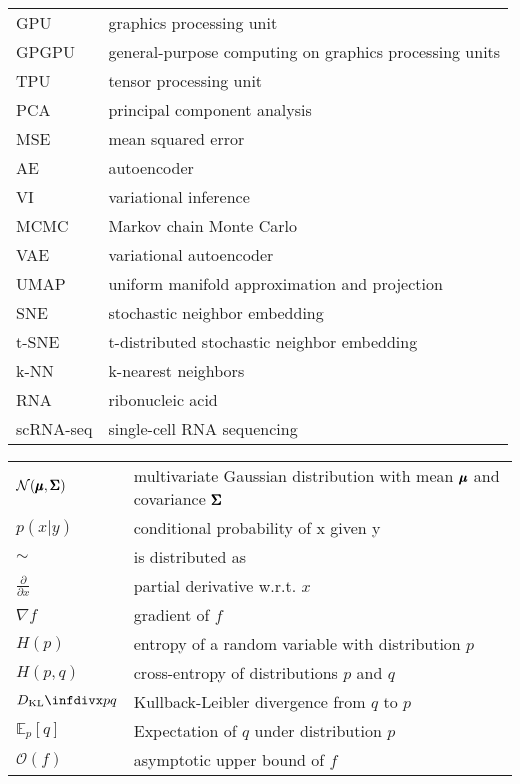 \begin{tabular}[h]{@{} p{} p{} @{}}
GPU & graphics processing unit \\
GPGPU & general-purpose computing on graphics processing units \\
TPU & tensor processing unit \\
PCA & principal component analysis \\
MSE & mean squared error \\
AE & autoencoder \\
VI & variational inference \\
MCMC & Markov chain Monte Carlo \\
VAE & variational autoencoder \\
UMAP & uniform manifold approximation and projection \\
SNE & stochastic neighbor embedding \\
t-SNE & t-distributed stochastic neighbor embedding \\
k-NN & k-nearest neighbors \\
RNA & ribonucleic acid \\
scRNA-seq & single-cell RNA sequencing
\end{tabular}

\begin{tabular}[h]{@{} p{} p{} @{}}
$\mathcal{N}(\pmb{\mu}, \pmb{\Sigma})$ & multivariate Gaussian distribution with mean $\pmb{\mu}$ and covariance $\pmb{\Sigma}$ \\
$p(x \vert y)$ & conditional probability of x given y \\
$\sim$ & is distributed as \\
$\frac{\partial}{\partial x}$ & partial derivative w.r.t. $x$ \\
$\nabla f$ & gradient of $f$ \\
$H(p)$ & entropy of a random variable with distribution $p$ \\
$H(p,q)$ & cross-entropy of distributions $p$ and $q$ \\
$\dkl{p}{q}$ & Kullback-Leibler divergence from $q$ to $p$ \\
$\mathbb{E}_{p}[q]$ & Expectation of $q$ under distribution $p$ \\
$\mathcal{O}(f)$ & asymptotic upper bound of $f$ \\
\end{tabular}
